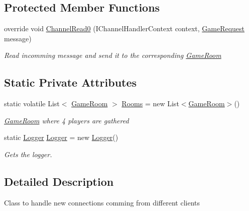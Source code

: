 \subsection*{Protected Member Functions}
\begin{DoxyCompactItemize}
\item 
override void \hyperlink{class_coinche_1_1_server_1_1_game_manager_a94fb29dfd64df404419f8136c1d0c907}{Channel\+Read0} (I\+Channel\+Handler\+Context context, \hyperlink{class_coinche_1_1_google_1_1_protobuf_1_1_game_request}{Game\+Request} message)
\begin{DoxyCompactList}\small\item\em Read incomming message and send it to the corresponding \hyperlink{class_coinche_1_1_server_1_1_game_room}{Game\+Room} \end{DoxyCompactList}\end{DoxyCompactItemize}
\subsection*{Static Private Attributes}
\begin{DoxyCompactItemize}
\item 
static volatile List$<$ \hyperlink{class_coinche_1_1_server_1_1_game_room}{Game\+Room} $>$ \hyperlink{class_coinche_1_1_server_1_1_game_manager_abf914b45ad131ab37252a63d3c23ac39}{Rooms} = new List$<$\hyperlink{class_coinche_1_1_server_1_1_game_room}{Game\+Room}$>$()
\begin{DoxyCompactList}\small\item\em \hyperlink{class_coinche_1_1_server_1_1_game_room}{Game\+Room} where 4 players are gathered \end{DoxyCompactList}\item 
static \hyperlink{class_coinche_1_1_tools_1_1_logger}{Logger} \hyperlink{class_coinche_1_1_server_1_1_game_manager_a59f6b50ef1be82252b05d12fcbf16258}{Logger} = new \hyperlink{class_coinche_1_1_tools_1_1_logger}{Logger}()
\begin{DoxyCompactList}\small\item\em Gets the logger. \end{DoxyCompactList}\end{DoxyCompactItemize}


\subsection{Detailed Description}
Class to handle new connections comming from different clients 

